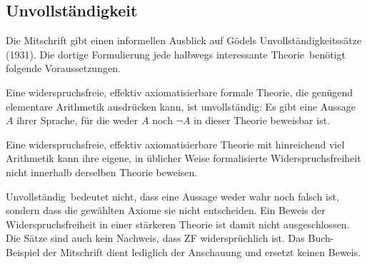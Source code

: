 \subsection{Unvollständigkeit}

Die Mitschrift gibt einen informellen Ausblick auf Gödels
Unvollständigkeitssätze (1931). Die dortige Formulierung
\glqq jede halbwegs interessante Theorie\grqq\ benötigt folgende
Voraussetzungen.

\begin{satz}
Eine widerspruchsfreie, effektiv axiomatisierbare formale Theorie, die
genügend elementare Arithmetik ausdrücken kann, ist unvollständig:
Es gibt eine Aussage $A$ ihrer Sprache, für die weder $A$ noch $\neg A$
in dieser Theorie beweisbar ist.
\end{satz}

\begin{satz}
Eine widerspruchsfreie, effektiv axiomatisierbare Theorie mit hinreichend
viel Arithmetik kann ihre eigene, in üblicher Weise formalisierte
Widerspruchsfreiheit nicht innerhalb derselben Theorie beweisen.
\end{satz}

\begin{bemerkung}[Einordnung]
\glqq Unvollständig\grqq\ bedeutet nicht, dass eine Aussage weder wahr
noch falsch ist, sondern dass die gewählten Axiome sie nicht entscheiden.
Ein Beweis der Widerspruchsfreiheit in einer stärkeren Theorie ist damit
nicht ausgeschlossen. Die Sätze sind auch kein Nachweis, dass ZF
widersprüchlich ist. Das Buch-Beispiel der Mitschrift dient lediglich
der Anschauung und ersetzt keinen Beweis.
\end{bemerkung}


